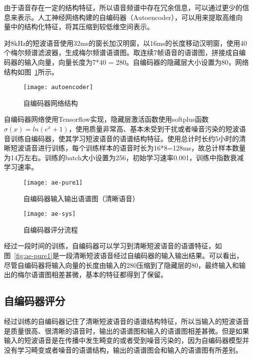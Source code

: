 由于语音存在一定的结构特征，所以语音频谱中存在冗余信息，可以通过更少的信息来表示。人工神经网络构建的自编码器（Autoencoder），可以用来提取高维向量中的结构化特征，将其压缩到较低维空间表示。

对8kHz的短波语音使用32ms的窗长加汉明窗，以16ms的长度移动汉明窗，使用40个梅尔频谱滤波器，生成梅尔频谱语谱图。取连续7帧语音的语谱图，拼接成自编码器的输入向量，向量长度为7*40 = 280。自编码器的隐藏层大小设置为80，网络结构如图~\ref{fig:autoencoder}所示。

\begin{figure}
\centering
\texttt{[image: autoencoder]}
\caption{自编码器网络结构\label{fig:autoencoder}}
\end{figure}

自编码器网络使用Tensorflow\cite{abadi2016tensorflow}实现，隐藏层激活函数使用softplus函数$\sigma(x)=ln⁡(e^x+1)$，使用质量非常高、基本未受到干扰或者噪音污染的短波语音训练自编码器，使其学习短波语音的语谱结构特征。使用总计时长约5小时的清晰短波语音进行训练，每个训练样本的语音时长为16*8=128ms，故总计样本数量为14万左右。训练的batch大小设置为256，初始学习速率0.001，训练中指数衰减学习速率。


\begin{figure}
\begin{minipage}{0.55\textwidth}
  \centering
  \texttt{[image: ae-pure1]}
  \caption{自编码器输入输出语谱图（清晰语音）\label{fig:ae-pure1}}
\end{minipage}
\begin{minipage}{0.35\textwidth}
  \centering
  \texttt{[image: ae-sys]}
  \caption{自编码器评分流程 \label{fig:ae-sys}}
\end{minipage}
\end{figure}

经过一段时间的训练，自编码器可以学习到清晰短波语音的语谱特征，如图~\ref{fig:ae-pure1}是一段清晰短波语音经过自编码器的输入输出结果。可以看出，尽管自编码器将输入向量的长度由输入的280压缩到了隐藏层的80，最终输入和输出的梅尔语谱图相差甚微，基本的特征都得到了保留。

\subsection{自编码器评分}

经过训练的自编码器记住了清晰短波语音的语谱结构特征，所以当输入的短波语音是质量很高、很清晰的语音时，输出的语谱图和输入的语谱图相差甚微。但是如果输入的短波语音是在传播中发生畸变的或者受到噪音污染的，因为自编码器模型并没有学习畸变或者噪音的语谱结构，输出的语谱图会和输入的语谱图有所差别。

